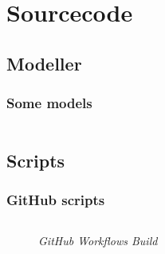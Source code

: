 \chapter{Sourcecode}
\label{appendix:sourcecode}

\section{Modeller}

\subsection{Some models}
\label{subsection:user-model}

\inputminted{csharp}{codefiles/models/ApplicationUser.cs}
\label{minted:application-user}

\section{Scripts}

\subsection{GitHub scripts}
\label{appendix:github-scripts}
\begin{figure}
    \inputminted{yaml}{codefiles/build.yml}
    \caption{\emph{GitHub Workflows Build}}
    \label{minted:build-yml}
\end{figure}